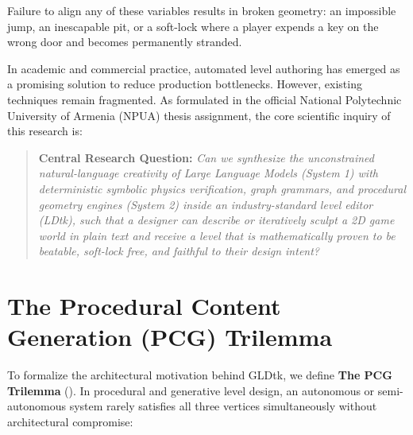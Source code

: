 \documentclass[11pt,a4paper]{report}
\theoremstyle{definition}
\theoremstyle{remark}
\begin{document}
Failure to align any of these variables results in broken geometry: an impossible jump, an inescapable pit, or a soft-lock where a player expends a key on the wrong door and becomes permanently stranded.

In academic and commercial practice, automated level authoring has emerged as a promising solution to reduce production bottlenecks. However, existing techniques remain fragmented. As formulated in the official National Polytechnic University of Armenia (NPUA) thesis assignment, the core scientific inquiry of this research is:

\begin{quote}
\textbf{Central Research Question:} \emph{Can we synthesize the unconstrained natural-language creativity of Large Language Models (System 1) with deterministic symbolic physics verification, graph grammars, and procedural geometry engines (System 2) inside an industry-standard level editor (LDtk), such that a designer can describe or iteratively sculpt a 2D game world in plain text and receive a level that is mathematically proven to be beatable, soft-lock free, and faithful to their design intent?}
\end{quote}

\section{The Procedural Content Generation (PCG) Trilemma}
\label{sec:trilemma}

To formalize the architectural motivation behind GLDtk, we define \textbf{The PCG Trilemma} (). In procedural and generative level design, an autonomous or semi-autonomous system rarely satisfies all three vertices simultaneously without architectural compromise:
\end{document}
